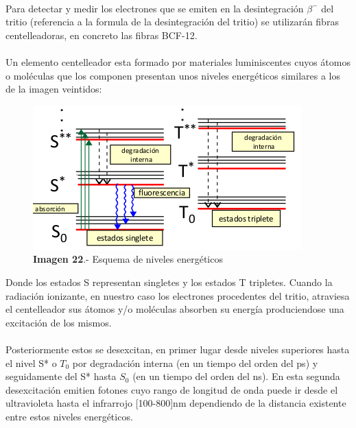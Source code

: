 \paragraph {}
Para detectar y medir los electrones que se emiten en la desintegración $\beta^-$ del tritio (referencia a la formula de la desintegración del tritio) se utilizarán fibras centelleadoras, en concreto las fibras BCF-12. 

\paragraph {}
Un elemento centelleador esta formado por materiales luminiscentes cuyos átomos o moléculas que los componen presentan unos niveles energéticos similares a los de la imagen veintidos:

\begin{figure}[hbtp]
\centering
\includegraphics[scale=0.5]{EsquemaNivelesFIbras.png}
\caption{\textbf{Imagen 22}.- Esquema de niveles energéticos}
\end{figure}

Donde los estados S representan singletes y los estados T tripletes. Cuando la radiación ionizante, en nuestro caso los electrones procedentes del tritio, atraviesa el centelleador sus átomos y/o moléculas absorben su energía produciendose una excitación de los mismos. 

\paragraph {}
Posteriormente estos se desexcitan, en primer lugar desde niveles superiores hasta el nivel S* o $T_0$ por degradación interna (en un tiempo del orden del ps) y seguidamente del S* hasta $S_0$ (en un tiempo del orden del ns). En esta segunda desexcitación emitien fotones cuyo rango de longitud de onda puede ir desde el ultravioleta hasta el infrarrojo [100-800]nm dependiendo de la distancia existente entre estos niveles energéticos. 

